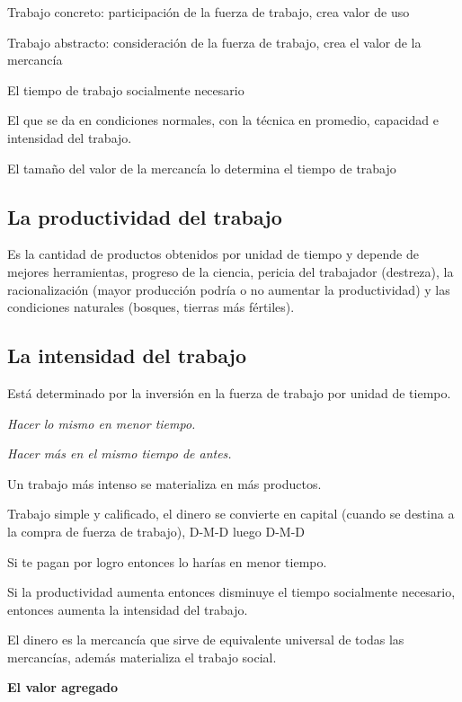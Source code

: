\documentclass[
  letterpaper,
  DIV=11,
  numbers=noendperiod]{scrartcl}
\begin{document}
Trabajo concreto: participación de la fuerza de trabajo, crea valor de
uso

Trabajo abstracto: consideración de la fuerza de trabajo, crea el valor
de la mercancía

El tiempo de trabajo socialmente necesario

El que se da en condiciones normales, con la técnica en promedio,
capacidad e intensidad del trabajo.

El tamaño del valor de la mercancía lo determina el tiempo de trabajo

\hypertarget{la-productividad-del-trabajo}{%
\subsection{La productividad del
trabajo}\label{la-productividad-del-trabajo}}

Es la cantidad de productos obtenidos por unidad de tiempo y depende de
mejores herramientas, progreso de la ciencia, pericia del trabajador
(destreza), la racionalización (mayor producción podría o no aumentar la
productividad) y las condiciones naturales (bosques, tierras más
fértiles).

\hypertarget{la-intensidad-del-trabajo}{%
\subsection{La intensidad del trabajo}\label{la-intensidad-del-trabajo}}

Está determinado por la inversión en la fuerza de trabajo por unidad de
tiempo.

\emph{Hacer lo mismo en menor tiempo.}

\emph{Hacer más en el mismo tiempo de antes.}

Un trabajo más intenso se materializa en más productos.

Trabajo simple y calificado, el dinero se convierte en capital (cuando
se destina a la compra de fuerza de trabajo), D-M-D luego D-M-D

Si te pagan por logro entonces lo harías en menor tiempo.

Si la productividad aumenta entonces disminuye el tiempo socialmente
necesario, entonces aumenta la intensidad del trabajo.

El dinero es la mercancía que sirve de equivalente universal de todas
las mercancías, además materializa el trabajo social.

\textbf{El valor agregado}
\end{document}

